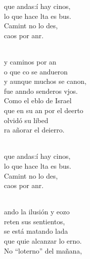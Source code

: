 \begin{cancion}%
	\begin{chorus}%
	 que andas:í hay cinos,  \\
	lo que hace lta es bus.\\
	Camint no lo des,\\
	 caos por anr.\\
	\end{chorus}%
	\jump\\
	y caminos por an \\
	o que co se andueron\\
	y aunque muchos se canon, \\
	fue anndo senderos vjos.\\
	Como el eblo de Israel \\
	que en su an por el deerto\\
	olvidó su libed \\
	ra añorar el deierro.\\\jump\\
	\begin{chorus}%
	 que andas:í hay cinos,  \\
	lo que hace lta es bus.\\
	Camint no lo des,\\
	 caos por anr.\\
	\end{chorus}%
	\jump\\
	ando la ilusión y eozo \\
	reten sus sentientos,\\
	se está matando lada\\
	que quie alcanzar lo erno.\\
	No “loterno” del mañana, \\

\end{cancion}
